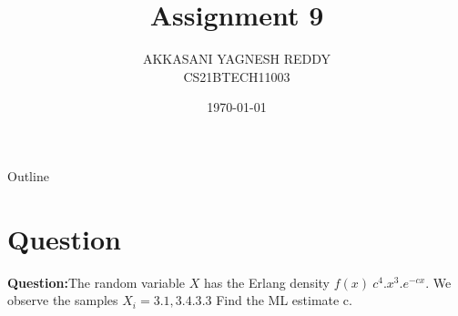\documentclass{beamer}
\title{Assignment 9}
\author{AKKASANI YAGNESH REDDY \\
     CS21BTECH11003 }
\date{\today}
\begin{document}
     \begin{frame}
     \maketitle    
     \end{frame}
     
     \logo{}
     
     \begin{frame}{Outline}
    \tableofcontents
     \end{frame}
      \section{Question}
      \begin{frame}
          

      \textbf{Question:}The random variable $X$ has the Erlang density $f(x)~c^{4}.x^{3}.e^{-cx}$. We observe the samples $X_{i} = 3.1, 3.4.3.3$ Find the ML estimate c.\\
           \end{frame}
           
\end{document}
